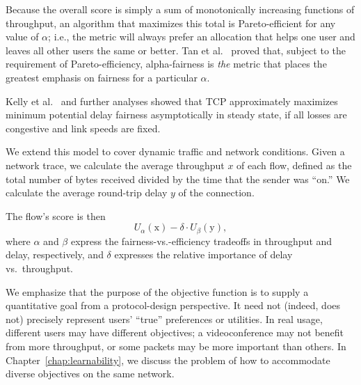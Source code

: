 Because the overall score is simply a sum of monotonically increasing
functions of throughput, an algorithm that maximizes this total is
Pareto-efficient for any value of $\alpha$; i.e., the metric will
always prefer an allocation that helps one user and leaves all other
users the same or better. Tan et al.~\cite{Tan09} proved that, subject
to the requirement of Pareto-efficiency, alpha-fairness is \emph{the}
metric that places the greatest emphasis on fairness for a particular
$\alpha$.

Kelly et al.~\cite{Kelly98} and further analyses showed that TCP
approximately maximizes minimum potential delay fairness
asymptotically in steady state, if all losses are congestive and link
speeds are fixed.

We extend this model to cover dynamic traffic and network
conditions. Given a network trace, we calculate the average throughput
$x$ of each flow, defined as the total number of bytes received
divided by the time that the sender was ``on.'' We calculate the
average round-trip delay $y$ of the connection.

The flow's score is then 
\begin{equation*}
U_\alpha(\textrm{x}) - \delta \cdot U_\beta(\textrm{y}),
\label{eq:util}
\end{equation*}
where $\alpha$ and $\beta$ express the fairness-vs.-efficiency
tradeoffs in throughput and delay, respectively, and $\delta$
expresses the relative importance of delay vs.~throughput.%


We emphasize that the purpose of the objective function is to supply a
quantitative goal from a protocol-design perspective. It need not
(indeed, does not) precisely represent users' ``true'' preferences or
utilities. In real usage, different users may have different
objectives; a videoconference may not benefit from more throughput, or
some packets may be more important than others. In
Chapter~\ref{chap:learnability}, we discuss the problem of how to
accommodate diverse objectives on the same network.


